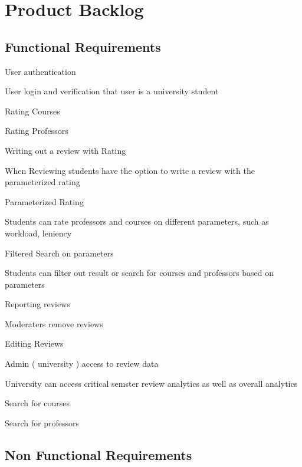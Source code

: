 \documentclass{article}
\begin{document}
\break
\section{Product Backlog}

\subsection{Functional Requirements}

	\quad User authentication 
	\vspace{-0.2cm}

	\qquad \scriptsize User login and verification that user is a university student \normalsize

	\quad Rating Courses

	\quad Rating Professors

	\quad Writing out a review with Rating
	\vspace{-0.2cm}

	\qquad \scriptsize When Reviewing students have the option to write a review with the parameterized rating \normalsize

	\quad Parameterized Rating
	\vspace{-0.2cm}

	\qquad \scriptsize Students can rate professors and courses on different parameters, such as workload, leniency \normalsize

	\quad Filtered Search on parameters 
	\vspace{-0.2cm}

	\qquad \scriptsize Students can filter out result or search for courses and professors based on parameters \normalsize

	\quad Reporting reviews 

	\quad Moderaters remove reviews

	\quad Editing Reviews

	\quad Admin ( university ) access to review data 
	\vspace{-0.2cm} 

	\qquad \scriptsize University can access critical semster review analytics as well as overall analytics \normalsize

	\quad Search for courses 

	\quad Search for professors 



\subsection{Non Functional Requirements} 
\end{document}
